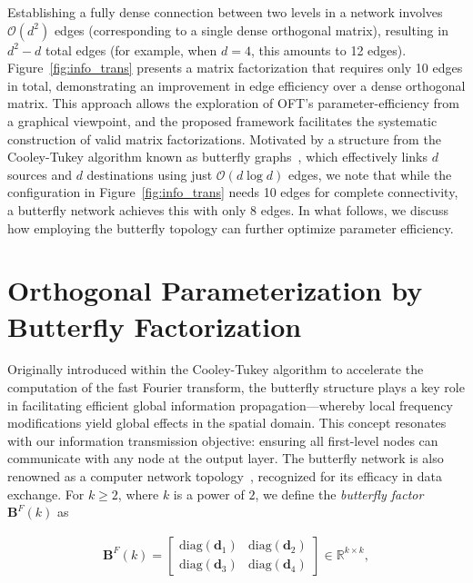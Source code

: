 Establishing a fully dense connection between two levels in a network involves $\mathcal{O}(d^2)$ edges (corresponding to a single dense orthogonal matrix), resulting in $d^2-d$ total edges (for example, when $d=4$, this amounts to 12 edges). Figure~\ref{fig:info_trans} presents a matrix factorization that requires only 10 edges in total, demonstrating an improvement in edge efficiency over a dense orthogonal matrix. This approach allows the exploration of OFT's parameter-efficiency from a graphical viewpoint, and the proposed framework facilitates the systematic construction of valid matrix factorizations. Motivated by a structure from the Cooley-Tukey algorithm known as butterfly graphs~\cite{cooley1965algorithm}, which effectively links $d$ sources and $d$ destinations using just $\mathcal{O}(d\log d)$ edges, we note that while the configuration in Figure~\ref{fig:info_trans} needs 10 edges for complete connectivity, a butterfly network achieves this with only 8 edges. In what follows, we discuss how employing the butterfly topology can further optimize parameter efficiency.

\section{Orthogonal Parameterization by Butterfly Factorization}

Originally introduced within the Cooley-Tukey algorithm to accelerate the computation of the fast Fourier transform, the butterfly structure plays a key role in facilitating efficient global information propagation—whereby local frequency modifications yield global effects in the spatial domain. This concept resonates with our information transmission objective: ensuring all first-level nodes can communicate with any node at the output layer. The butterfly network is also renowned as a computer network topology~\cite{solihin2015fundamentals,li2011linear}, recognized for its efficacy in data exchange. For $k\geq 2$, where $k$ is a power of $2$, we define the \emph{butterfly factor} $\bm{B}^F(k)$ as

\begin{equation}\label{eq:but_factor}
\begin{aligned}
    \bm{B}^F(k)=\begin{bmatrix}
    \text{diag}(\bm{d}_1) & \text{diag}(\bm{d}_2) \\
    \text{diag}(\bm{d}_3) & \text{diag}(\bm{d}_4)
    \end{bmatrix}\in\mathbb{R}^{k\times k},
\end{aligned}
\end{equation}

